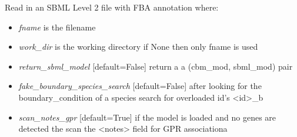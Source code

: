 \documentclass[a4paper,11pt,english]{sphinxmanual}
\begin{document}
\begin{fulllineitems}
\label{modules_doc:cbmpy.CBRead.readSBML2FBA}
Read in an SBML Level 2 file with FBA annotation where:
\begin{itemize}
\item {} 
\emph{fname} is the filename

\item {} 
\emph{work\_dir} is the working directory if None then only fname is used

\item {} 
\emph{return\_sbml\_model} {[}default=False{]} return a a (cbm\_mod, sbml\_mod) pair

\item {} 
\emph{fake\_boundary\_species\_search} {[}default=False{]} after looking for the boundary\_condition of a species search for overloaded id's \textless{}id\textgreater{}\_b

\item {} 
\emph{scan\_notes\_gpr} {[}default=True{]} if the model is loaded and no genes are detected the scan the \textless{}notes\textgreater{} field for GPR associationa

\end{itemize}

\end{fulllineitems}

\end{document}

